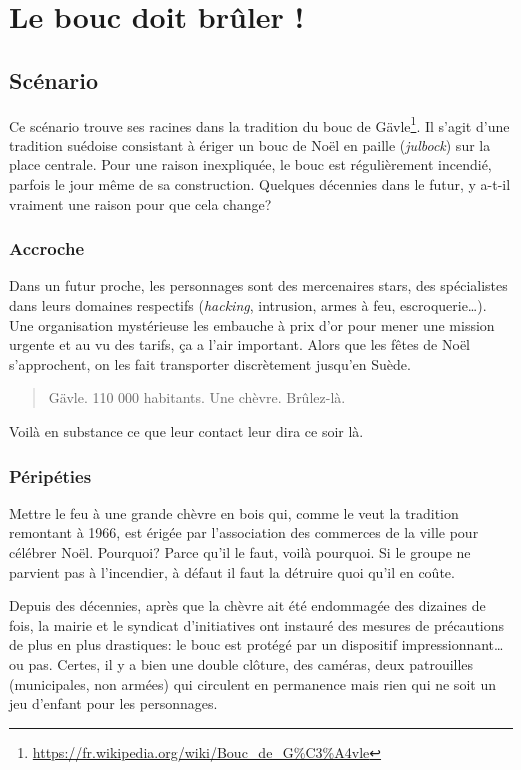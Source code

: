 \chapter{Le bouc doit brûler !}

\section{Scénario}

Ce scénario trouve ses racines dans la tradition du bouc de Gävle\footnote{\url{https://fr.wikipedia.org/wiki/Bouc_de_G\%C3\%A4vle}}.
Il s'agit d'une tradition suédoise consistant à ériger un bouc de Noël en paille (\emph{julbock}) sur la place centrale.
Pour une raison inexpliquée, le bouc est régulièrement incendié, parfois le jour même de sa construction.
Quelques décennies dans le futur, y a-t-il vraiment une raison pour que cela change?

\subsection{Accroche}

Dans un futur proche, les personnages sont des mercenaires stars, des spécialistes dans leurs domaines respectifs (\emph{hacking}, intrusion, armes à feu, escroquerie\dots).
Une organisation mystérieuse les embauche à prix d'or pour mener une mission urgente et au vu des tarifs, ça a l'air important.
Alors que les fêtes de Noël s'approchent, on les fait transporter discrètement jusqu'en Suède.

\blockquote{Gävle. 110 000 habitants. Une chèvre. Brûlez-là.}

Voilà en substance ce que leur contact leur dira ce soir là.

\subsection{Péripéties}

Mettre le feu à une grande chèvre en bois qui, comme le veut la tradition remontant à 1966, est érigée par l'association des commerces de la ville pour célébrer Noël.
Pourquoi? Parce qu'il le faut, voilà pourquoi.
Si le groupe ne parvient pas à l'incendier, à défaut il faut la détruire quoi qu'il en coûte.

Depuis des décennies, après que la chèvre ait été endommagée des dizaines de fois, la mairie et le syndicat d'initiatives ont instauré des mesures de précautions de plus en plus drastiques: le bouc est protégé par un dispositif impressionnant\dots ou pas.
Certes, il y a bien une double clôture, des caméras, deux patrouilles (municipales, non armées) qui circulent en permanence mais rien qui ne soit un jeu d'enfant pour les personnages.

